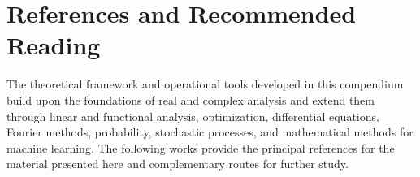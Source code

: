 \chapter*{References and Recommended Reading}

The theoretical framework and operational tools developed in this compendium build upon the foundations of real and complex analysis and extend them through linear and functional analysis, optimization, differential equations, Fourier methods, probability, stochastic processes, and mathematical methods for machine learning. The following works provide the principal references for the material presented here and complementary routes for further study.

